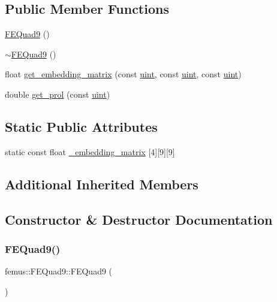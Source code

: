 \subsection*{Public Member Functions}
\begin{DoxyCompactItemize}
\item 
\mbox{\hyperlink{classfemus_1_1_f_e_quad9_aef756e1d2394bb1f250e7c0432386b38}{F\+E\+Quad9}} ()
\item 
\mbox{\hyperlink{classfemus_1_1_f_e_quad9_aab5566e0872fcf558714f0aa062d5805}{$\sim$\+F\+E\+Quad9}} ()
\item 
float \mbox{\hyperlink{classfemus_1_1_f_e_quad9_a2c82794ee74ebbbde0fd8e9c9b73ba7a}{get\+\_\+embedding\+\_\+matrix}} (const \mbox{\hyperlink{_typedefs_8hpp_a91ad9478d81a7aaf2593e8d9c3d06a14}{uint}}, const \mbox{\hyperlink{_typedefs_8hpp_a91ad9478d81a7aaf2593e8d9c3d06a14}{uint}}, const \mbox{\hyperlink{_typedefs_8hpp_a91ad9478d81a7aaf2593e8d9c3d06a14}{uint}})
\item 
double \mbox{\hyperlink{classfemus_1_1_f_e_quad9_ab4f40a93ba2ea9c54243a8b0d8402edc}{get\+\_\+prol}} (const \mbox{\hyperlink{_typedefs_8hpp_a91ad9478d81a7aaf2593e8d9c3d06a14}{uint}})
\end{DoxyCompactItemize}
\subsection*{Static Public Attributes}
\begin{DoxyCompactItemize}
\item 
static const float \mbox{\hyperlink{classfemus_1_1_f_e_quad9_a5ee9abeea6cd4e80b01ff1a3a0f26550}{\+\_\+embedding\+\_\+matrix}} \mbox{[}4\mbox{]}\mbox{[}9\mbox{]}\mbox{[}9\mbox{]}
\end{DoxyCompactItemize}
\subsection*{Additional Inherited Members}


\subsection{Constructor \& Destructor Documentation}
\mbox{\label{classfemus_1_1_f_e_quad9_aef756e1d2394bb1f250e7c0432386b38}} 
\subsubsection{\texorpdfstring{F\+E\+Quad9()}{FEQuad9()}}
{\footnotesize\ttfamily femus\+::\+F\+E\+Quad9\+::\+F\+E\+Quad9 (\begin{DoxyParamCaption}{ }\end{DoxyParamCaption})}

